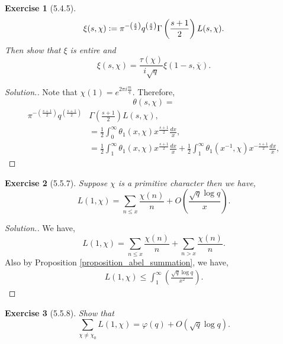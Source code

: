 \documentclass{article}
\newtheorem{exercise}{Exercise}[section]
\newcommand{\defeq}{\vcentcolon=}
\begin{document}
\begin{exercise}[5.4.5]
  \begin{align*}
    \xi(s,\chi)\defeq \pi^{-\left({\frac {s} 2}\right)}q^{\left({\frac {s} 2}\right)}\Gamma\left({\frac {s+1} 2}\right)L(s,\chi).
  \end{align*}
  Then show that $\xi$ is entire and 
  \begin{equation*}
    \xi(s,\chi) = {\frac {\tau(\chi)} {i\sqrt{q}}}\xi(1-s,\overline{\chi}).
  \end{equation*}
\end{exercise}
\begin{proof}[Solution.]
  Note that $\chi(1) = e^{2\pi i{\frac m q}}$. Therefore, 
  \begin{equation*}
    \theta(s,\chi) = 
  \end{equation*}
   \begin{align*}
    \pi^{-\left({\frac {s+1} 2}\right)}q^{\left({\frac {s+1} 2}\right)}&\Gamma\left({\frac {s+1} 2}\right)L(s,\chi),\\
    &={\frac 1 2}\int_0^\infty \theta_1(x,\chi)x^{{\frac {s+1} 2}}{\frac {dx} x},\\
    & = {\frac 1 2}\int_1^\infty \theta_1(x,\chi)x^{{\frac {s+1} 2}}{\frac {dx} x}+{\frac 1 2}\int_1^\infty \theta_1(x^{-1},\chi)x^{-{\frac {s+1} 2}}{\frac {dx} {x}},
  \end{align*}
\end{proof}
\begin{exercise}[5.5.7]
  Suppose $\chi$ is a primitive character then we have,
  \begin{equation*}
    L(1,\chi) = \sum_{n\leq x}{\frac {\chi(n)} n}+O\left({\frac {\sqrt{q}\log q} x}\right).
  \end{equation*}
\end{exercise}
\begin{proof}[Solution.]
  We have,
  \begin{equation*}
    L(1,\chi)= \sum_{n\leq x}{\frac {\chi(n)} n}+\sum_{n> x}{\frac {\chi(n)} n}.
  \end{equation*}
  Also by Proposition \ref{proposition_abel_summation}, we have,
  \begin{align*}
    L(1,\chi)\leq \int_1^\infty \left({\frac {\sqrt{q}\log q} {x^2}}\right).
  \end{align*}
\end{proof}
\begin{exercise}[5.5.8]
  Show that 
  \begin{equation*}
    \sum_{\chi\not=\chi_0}L(1,\chi) = \varphi(q)+O(\sqrt{q}\log q).
  \end{equation*}
\end{exercise}
\end{document}
